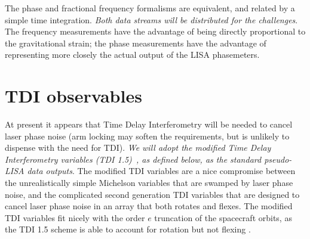 \documentclass[11pt]{report}
\begin{document}
The phase and fractional frequency formalisms are equivalent, and related by a simple time integration.
{\em Both data streams will be distributed for the challenges}. The frequency measurements have the advantage of being directly proportional to the
gravitational strain; the phase measurements have the advantage of representing more closely the actual output
of the LISA phasemeters.  

\section{TDI observables}
\label{sec:tdi}

At present it appears that Time Delay Interferometry \cite{firstgen} will be needed to cancel laser phase
noise (arm locking may soften the requirements, but is unlikely to dispense with the need for TDI).
{\em We will adopt the modified Time Delay Interferometry variables (TDI 1.5)~\cite{secondgen,modified},
as defined below, as the standard pseudo-LISA data outputs}. The modified TDI variables are a nice compromise
between the unrealistically simple Michelson variables that are swamped by laser phase noise, and the complicated
second generation TDI variables
that are designed to cancel laser phase noise in an array that both rotates and flexes. The modified
TDI variables fit nicely with the order $e$ truncation of the spacecraft orbits, as the TDI 1.5 scheme is
able to account for rotation but not flexing \cite{modified}.
\end{document}
